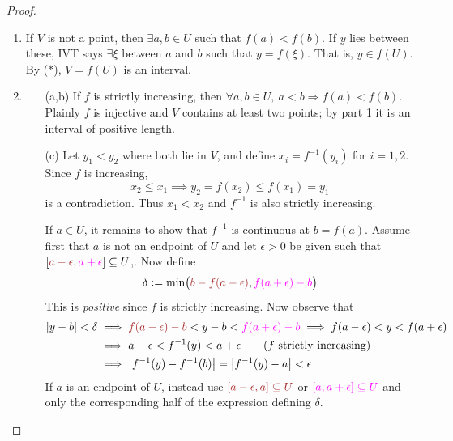 \begin{proof}
	\begin{enumerate}
	  \item If $V$ is not a point, then $\exists a,b\in U$ such that $f(a)<f(b)$. If $y$ lies between these, IVT says $\exists\xi$ between $a$ and $b$ such that $y=f(\xi)$. That is, $y\in f(U)$. By ($\ast$), $V=f(U)$ is an interval.
	  \item\begin{enumerate}
	    \item[(a,b)] If $f$ is strictly increasing, then $\forall a,b\in U,\ a<b\Longrightarrow f(a)<f(b)$. Plainly $f$ is injective and $V$ contains at least two points; by part 1 it is an interval of positive length.
	    \item[(c)] Let $y_1<y_2$ where both lie in $V$, and define $x_i=f^{-1}(y_i)$ for $i=1,2$. Since $f$ is increasing,
			\[
				x_2\le x_1\implies y_2=f(x_2)\le f(x_1)=y_1
			\]
			is a contradiction. Thus $x_1<x_2$ and $f^{-1}$ is also strictly increasing.\par
			If $a\in U$, it remains to show that $f^{-1}$ is continuous at $b=f(a)$. Assume first that $a$ is not an endpoint of $U$ and let $\epsilon>0$ be given such that $[\textcolor{Brown}{a-\epsilon},\textcolor{Magenta}{a+\epsilon}]\subseteq U$,. Now define
			\[
				\delta:=\min\bigl(\textcolor{Brown}{b-f(a-\epsilon)},
					\textcolor{Magenta}{f(a+\epsilon)-b}\bigr)
			\]
			This is \emph{positive} since $f$ is strictly increasing. Now observe that
			\begin{align*}
				\nm{y-b}<\delta
				&\implies \textcolor{Brown}{f(a-\epsilon)-b}
					<y-b
					<\textcolor{Magenta}{f(a+\epsilon)-b}
				\implies f(a-\epsilon)<y<f(a+\epsilon)\\
				&\implies a-\epsilon
					<f^{-1}(y)
					<a+\epsilon
					\tag{$f$ strictly increasing}\\
				&\implies \nm{f^{-1}(y)-f^{-1}(b)}=\nm{f^{-1}(y)-a}<\epsilon
			\end{align*}
			If $a$ is an endpoint of $U$, instead use $\textcolor{Brown}{[a-\epsilon,a]\subseteq U}$ or $\textcolor{Magenta}{[a,a+\epsilon]\subseteq U}$ and only the corresponding half of the expression defining $\delta$.\qedhere
	  \end{enumerate}
	\end{enumerate}
\end{proof}


\goodbreak


